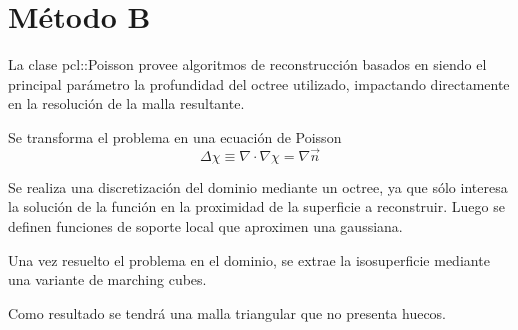 	\section{Método B}
	La clase pcl::Poisson provee algoritmos de reconstrucción basados en %
	siendo el principal parámetro la profundidad del octree utilizado,
	impactando directamente en la resolución de la malla resultante.


	Se transforma el problema en una ecuación de Poisson
	\[\Delta\chi \equiv \nabla \cdot\nabla\chi = \nabla \vec{n}\]

	Se realiza una discretización del dominio mediante un octree, ya que sólo
	interesa la solución de la función en la proximidad de la superficie a
	reconstruir.
	Luego se definen funciones de soporte local que aproximen una gaussiana.

	Una vez resuelto el problema en el dominio, se extrae la isosuperficie mediante una variante de marching cubes.

	Como resultado se tendrá una malla triangular que no presenta huecos.


